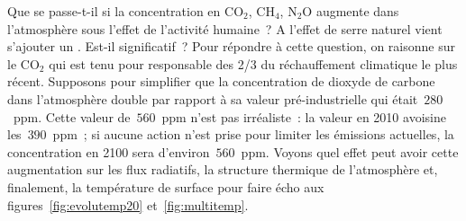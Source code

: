 \sk
Que se passe-t-il si la concentration en CO$_2$, CH$_4$, N$_2$O augmente dans l'atmosphère sous l'effet de l'activité humaine~? A l'effet de serre naturel vient s'ajouter un . Est-il significatif~? Pour répondre à cette question, on raisonne sur le CO$_2$ qui est tenu pour responsable des 2/3 du réchauffement climatique le plus récent. Supposons pour simplifier que la concentration de dioxyde de carbone dans l'atmosphère double par rapport à sa valeur pré-industrielle qui était~$280$~ppm. Cette valeur de~$560$~ppm n'est pas irréaliste~: la valeur en 2010 avoisine les~$390$~ppm~; si aucune action n'est prise pour limiter les émissions actuelles, la concentration en 2100 sera d'environ~$560$~ppm. Voyons quel effet peut avoir cette augmentation sur les flux radiatifs, la structure thermique de l'atmosphère et, finalement, la température de surface pour faire écho aux figures~\ref{fig:evolutemp20} et~\ref{fig:multitemp}.


